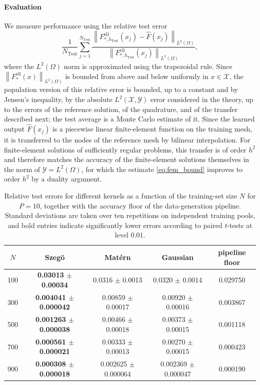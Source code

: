 \documentclass[11pt]{article}
\numberwithin{equation}{section}
\theoremstyle{plain}
\theoremstyle{definition}
\theoremstyle{remark}
\newcommand{\X}{\mathcal{X}}
\newcommand{\Y}{\mathcal{Y}}
\newcommand{\norm}[1]{\left\lVert#1\right\rVert}
\newcommand{\Fell}{F_{*}^{\mathrm{ell}}}
\begin{document}
\paragraph{Evaluation}
We measure performance using the relative test error
$$
\frac{1}{N_{\mathrm{Test}}}
\sum_{j=1}^{N_{\mathrm{Test}}}
\frac{
\norm{
F^{\mathrm{ell}}_{*,h_{\mathrm{Test}}}(x_j)-\widehat F(x_j)
}_{L^2(\Omega)}
}{
\norm{
F^{\mathrm{ell}}_{*,h_{\mathrm{Test}}}(x_j)
}_{L^2(\Omega)}
},
$$
where the $L^2(\Omega)$ norm is approximated using the trapezoidal rule. Since
$\norm{\Fell(x)}_{L^2(\Omega)}$ is bounded from above and below uniformly in
$x\in\X$, the population version of this relative error is bounded, up to a constant and by Jensen's inequality, by the absolute
$L^2(\X,\Y)$ error considered in the theory, up to the errors of the reference solution, of the quadrature, and of the transfer described next; the test average is a Monte Carlo estimate of it. Since the learned output $\widehat F(x_j)$ is a piecewise linear finite-element function on the training mesh, it is transferred to the nodes of the reference mesh by bilinear interpolation. For finite-element solutions of sufficiently regular problems, this transfer is of order $h^2$ and therefore matches the accuracy of the finite-element solutions themselves in the norm of $\Y=L^2(\Omega)$, for which the estimate \eqref{eq:fem_bound} improves to order $h^2$ by a duality argument.

\begin{table}[tbp]
\centering
\begin{tabular}{c|ccc|c}
$N$ & Szegö & Matérn & Gaussian & pipeline floor \\
\hline
100 & \textbf{0.03013 $\pm$ 0.00034} & 0.0316 $\pm$ 0.0013 & 0.0320 $\pm$ 0.0014 & 0.029750 \\
300 & \textbf{0.004041 $\pm$ 0.000042} & 0.00859 $\pm$ 0.00017 & 0.00920 $\pm$ 0.00016 & 0.003867 \\
500 & \textbf{0.001263 $\pm$ 0.000038} & 0.00466 $\pm$ 0.00018 & 0.00373 $\pm$ 0.00015 & 0.001118 \\
700 & \textbf{0.000561 $\pm$ 0.000021} & 0.00333 $\pm$ 0.00013 & 0.00270 $\pm$ 0.00015 & 0.000423 \\
900 & \textbf{0.000308 $\pm$ 0.000018} & 0.002625 $\pm$ 0.000064 & 0.002369 $\pm$ 0.000047 & 0.000190 \\
\end{tabular}
\caption{Relative test errors for different kernels as a function of the training-set size $N$ for $P=10$, together with the accuracy floor of the data-generation pipeline. Standard deviations are taken over ten repetitions on independent training pools, and bold entries indicate significantly lower errors according to paired $t$-tests at level $0.01$.
}
\label{tab:results}
\end{table}
\end{document}
